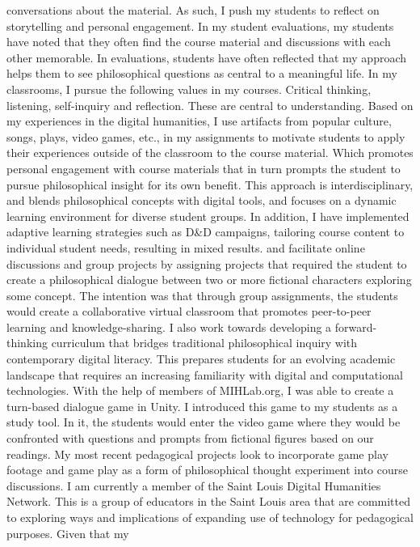 \documentclass[
  letterpaper,
  DIV=11,
  numbers=noendperiod]{scrartcl}
\begin{document}
conversations about the material. As such, I push my students to reflect
on storytelling and personal engagement. In my student evaluations, my
students have noted that they often find the course material and
discussions with each other memorable. In evaluations, students have
often reflected that my approach helps them to see philosophical
questions as central to a meaningful life. In my classrooms, I pursue
the following values in my courses. Critical thinking, listening,
self-inquiry and reflection. These are central to understanding. Based
on my experiences in the digital humanities, I use artifacts from
popular culture, songs, plays, video games, etc., in my assignments to
motivate students to apply their experiences outside of the classroom to
the course material. Which promotes personal engagement with course
materials that in turn prompts the student to pursue philosophical
insight for its own benefit. This approach is interdisciplinary, and
blends philosophical concepts with digital tools, and focuses on a
dynamic learning environment for diverse student groups. In addition, I
have implemented adaptive learning strategies such as D\&D campaigns,
tailoring course content to individual student needs, resulting in mixed
results. and facilitate online discussions and group projects by
assigning projects that required the student to create a philosophical
dialogue between two or more fictional characters exploring some
concept. The intention was that through group assignments, the students
would create a collaborative virtual classroom that promotes
peer-to-peer learning and knowledge-sharing. I also work towards
developing a forward-thinking curriculum that bridges traditional
philosophical inquiry with contemporary digital literacy. This prepares
students for an evolving academic landscape that requires an increasing
familiarity with digital and computational technologies. With the help
of members of MIHLab.org, I was able to create a turn-based dialogue
game in Unity. I introduced this game to my students as a study tool. In
it, the students would enter the video game where they would be
confronted with questions and prompts from fictional figures based on
our readings. My most recent pedagogical projects look to incorporate
game play footage and game play as a form of philosophical thought
experiment into course discussions. I am currently a member of the Saint
Louis Digital Humanities Network. This is a group of educators in the
Saint Louis area that are committed to exploring ways and implications
of expanding use of technology for pedagogical purposes. Given that my
\end{document}

